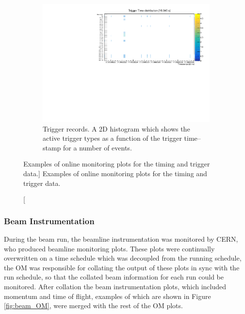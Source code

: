 \begin{figure}
	\begin{subfigure}[b]{0.8\textwidth}
		\centering
		\vspace{3mm}
		\includegraphics[width=\textwidth]{figures/trigger_record.pdf}
		\caption {Trigger records. A 2D histogram which shows the active trigger
		types as a function of the trigger time--stamp for a number of events.}
		\label{fig:trig_record}
	\end{subfigure}

	\caption
	[Examples of online monitoring plots for the timing and trigger data.]
	{Examples of online monitoring plots for the timing and trigger data.}
	\label{fig:timing_OM}

\end{figure}

\subsubsection*{Beam Instrumentation}
During the \protodune{} beam run, the beamline instrumentation was monitored 
by CERN, who produced beamline monitoring plots\cite{Booth:2019brj}. These plots
were continually overwritten on a time schedule which was decoupled from the 
\protodune{} running schedule, the OM was responsible for collating the output 
of these plots in sync with the \protodune{} run schedule, so that the 
collated beam information for each run could be monitored. After collation the 
beam instrumentation plots, which included momentum and time of flight, examples
of which are shown in Figure \ref{fig:beam_OM}, were merged with the rest of 
the OM plots. 

